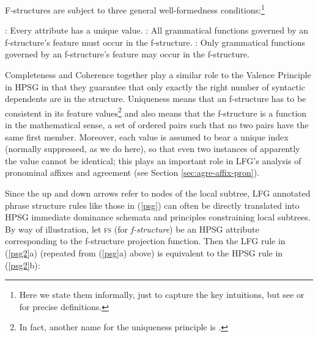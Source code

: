 \noindent
F-structures are subject to three general well-formedness conditions:\footnote{Here we state them informally, just to capture the key intuitions, but see \citet{KB82a-u} or \citet[52--53]{dalrymple;ea19} for precise definitions.}
%
\begin{exe}
  \ex {}: 
Every attribute has a unique value.
\ex {}: All grammatical functions governed by an f-structure's  feature must occur in the f-structure. 
  \ex {}: Only grammatical functions governed by an f-structure's  feature may occur in the f-structure.
\end{exe}
%
Completeness and Coherence together play a similar role to the Valence Principle in HPSG in that they guarantee that only exactly the right number of syntactic dependents are in the structure.  Uniqueness means that an f-structure has to be consistent in its feature values\footnote{In fact, another name for the uniqueness principle is  \citep[53]{dalrymple;ea19}.} and also means that the f-structure is a function in the mathematical sense, a set of ordered pairs such that no two pairs have the same first member. Moreover, each  value is assumed to bear a unique index (normally suppressed, as we do here), so that even two instances of apparently the   value cannot be identical; this plays an important role in LFG's analysis of pronominal affixes and agreement (see Section \ref{sec:agre-affix-pron}).


Since the up and down arrows refer to nodes of the local subtree, LFG annotated phrase structure rules like those in (\ref{psg}) can often be directly translated into HPSG immediate dominance schemata and principles constraining local subtrees.  
By way of illustration, let \textsc{fs} (for \textit{f-structure}) be an HPSG attribute corresponding to the f-structure projection function.  Then the LFG rule in (\ref{psg2}a) (repeated from (\ref{psg}a) above) is equivalent to the  HPSG rule in (\ref{psg2}b):

\eal 
 \label{psg2}
\ex
{
}
               
\ex 
{
}
\zl

